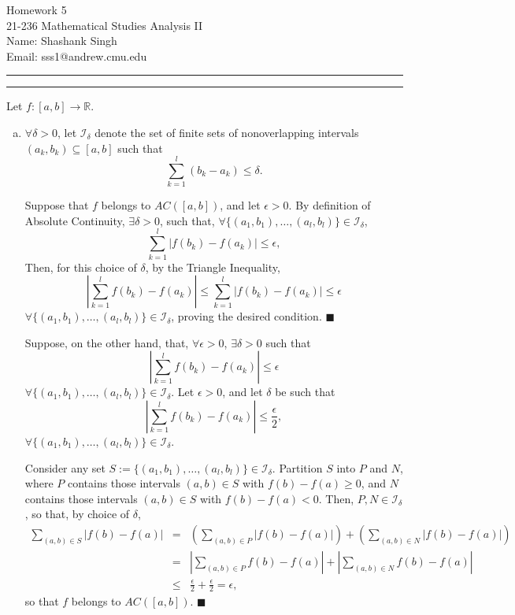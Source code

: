 \documentclass[11pt]{article}
\makeatletter
\newcounter{questionCounter}
\newcounter{partCounter}[questionCounter]
\newenvironment{question}[2][\arabic{questionCounter}]{%
    \setcounter{partCounter}{0}%
    \vspace{.25in} \hrule \vspace{0.5em}%
        \noindent{\bf #2}%
    \vspace{0.8em} \hrule \vspace{.10in}%
    \addtocounter{questionCounter}{1}%
}{}
\newcommand{\myname}{Shashank Singh}
\newcommand{\myandrew}{sss1@andrew.cmu.edu}
\newcommand{\myclass}{21-236 Mathematical Studies Analysis II}
\newcommand{\myhwnum}{5}
\makeatother
\begin{document}
\thispagestyle{plain}

{\Large Homework \myhwnum} \\
\myclass \\
Name: \myname \\
Email: \myandrew \\
\begin{question}{Problem 1}
Let $f: [a,b] \rightarrow \mathbb{R}$.
\begin{enumerate}[(a)]
\item $\forall \delta > 0$, let $\mathcal{I}_{\delta}$ denote the set of
finite sets of nonoverlapping intervals $(a_k,b_k) \subseteq [a,b]$ such that
\[\sum_{k = 1}^l (b_k - a_k) \leq \delta.\]

Suppose that $f$ belongs to $AC([a,b])$, and let $\epsilon > 0$. By
definition of Absolute Continuity, $\exists \delta > 0$, such that,
$\forall \{(a_1,b_1),\ldots,(a_l,b_l)\} \in \mathcal{I}_{\delta}$,
\[\sum_{k = 1}^l |f(b_k) - f(a_k)| \leq \epsilon,\] Then, for this choice of
$\delta$, by the Triangle Inequality,
\[\left| \sum_{k = 1}^l f(b_k) - f(a_k) \right|
    \leq \sum_{k = 1}^l |f(b_k) - f(a_k)| \leq \epsilon\]
$\forall \{(a_1,b_1),\ldots,(a_l,b_l)\} \in \mathcal{I}_{\delta}$,
proving the desired condition. \quad $\blacksquare$

Suppose, on the other hand, that, $\forall \epsilon > 0$,
$\exists \delta > 0$ such that
\[\left| \sum_{k = 1}^l f(b_k) - f(a_k) \right| \leq \epsilon\]
$\forall \{(a_1,b_1),\ldots,(a_l,b_l)\} \in \mathcal{I}_{\delta}$.
Let $\epsilon > 0$, and let $\delta$ be such that
\[\left| \sum_{k = 1}^l f(b_k) - f(a_k) \right| \leq \frac{\epsilon}{2},\]
$\forall \{(a_1,b_1),\ldots,(a_l,b_l)\} \in \mathcal{I}_{\delta}$.

Consider any set
$S := \{(a_1,b_1),\ldots,(a_l,b_l)\} \in \mathcal{I}_{\delta}$. Partition $S$
into $P$ and $N$, where $P$ contains those intervals $(a,b) \in S$ with
$f(b) - f(a) \geq 0$, and $N$ contains those intervals $(a,b) \in S$ with
$f(b) - f(a) < 0$. Then, $P,N \in \mathcal{I}_{\delta}$,
so that, by choice of $\delta$,
\begin{eqnarray*}
\sum_{(a,b) \in S} |f(b) - f(a)|
 &  =   & \left(\sum_{(a,b) \in P} |f(b) - f(a)|\right) + \left(\sum_{(a,b) \in N} |f(b) - f(a)|\right) \\
 &  =   & \left|\sum_{(a,b) \in P} f(b) - f(a)\right| + \left|\sum_{(a,b) \in N} f(b) - f(a)\right| \\
 & \leq & \frac{\epsilon}{2} + \frac{\epsilon}{2} = \epsilon,
\end{eqnarray*}
so that $f$ belongs to $AC([a,b])$. \quad $\blacksquare$


\end{enumerate}
\end{question}
\end{document}
